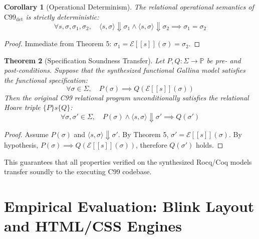 \documentclass[10pt,journal,compsoc]{IEEEtran}
\newcommand{\llbracket}{[\![}
\newcommand{\rrbracket}{]\!]}
\newtheorem{theorem}{Theorem}
\newtheorem{corollary}[theorem]{Corollary}
\begin{document}
\begin{corollary}[Operational Determinism]
The relational operational semantics of $\text{C99}_{\text{det}}$ is strictly deterministic:
\begin{equation}
\forall s, \sigma, \sigma_1, \sigma_2, \quad \langle s, \sigma \rangle \Downarrow \sigma_1 \land \langle s, \sigma \rangle \Downarrow \sigma_2 \implies \sigma_1 = \sigma_2
\end{equation}
\end{corollary}
\begin{proof}
Immediate from Theorem 5: $\sigma_1 = \mathcal{E}\llbracket s \rrbracket(\sigma) = \sigma_2$.
\end{proof}

\begin{theorem}[Specification Soundness Transfer]
Let $P, Q : \Sigma \to \mathbb{P}$ be pre- and post-conditions. Suppose that the synthesized functional Gallina model satisfies the functional specification:
\begin{equation}
\forall \sigma \in \Sigma, \quad P(\sigma) \implies Q(\mathcal{E}\llbracket s \rrbracket(\sigma))
\end{equation}
Then the original C99 relational program unconditionally satisfies the relational Hoare triple $\{P\} s \{Q\}$:
\begin{equation}
\forall \sigma, \sigma' \in \Sigma, \quad P(\sigma) \land \langle s, \sigma \rangle \Downarrow \sigma' \implies Q(\sigma')
\end{equation}
\end{theorem}
\begin{proof}
Assume $P(\sigma)$ and $\langle s, \sigma \rangle \Downarrow \sigma'$. By Theorem 5, $\sigma' = \mathcal{E}\llbracket s \rrbracket(\sigma)$. By hypothesis, $P(\sigma) \implies Q(\mathcal{E}\llbracket s \rrbracket(\sigma))$, therefore $Q(\sigma')$ holds.
\end{proof}
This guarantees that all properties verified on the synthesized Rocq/Coq models transfer soundly to the executing C99 codebase.

\section{Empirical Evaluation: Blink Layout and HTML/CSS Engines}
\end{document}
